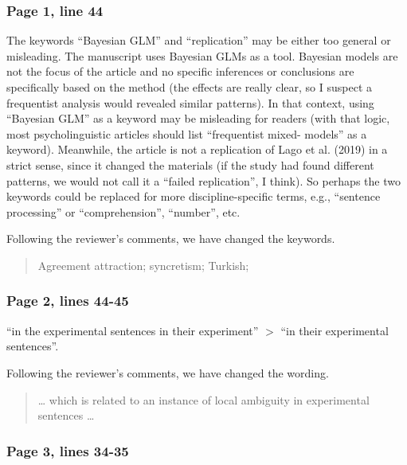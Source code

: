 \documentclass{ar2rc}
\begin{document}
\subsubsection{Page 1, line 44}

\RC The keywords ``Bayesian GLM'' and ``replication'' may be either too general or misleading. The manuscript uses Bayesian GLMs as a tool. Bayesian models are not the focus of the article and no specific inferences or conclusions are specifically based on the method (the effects are really clear, so I suspect a frequentist analysis would revealed similar patterns). In that context, using ``Bayesian GLM'' as a keyword may be misleading for readers (with that logic, most psycholinguistic articles should list ``frequentist mixed- models'' as a keyword). Meanwhile, the article is not a replication of Lago et al. (2019) in a strict sense, since it changed the materials (if the study had found different patterns, we would not call it a ``failed replication'', I think). So perhaps the two keywords could be replaced for more discipline-specific terms, e.g., ``sentence processing'' or ``comprehension'', ``number'', etc.

\AR Following the reviewer's comments, we have changed the keywords.

\begin{quote}
    Agreement attraction; syncretism; Turkish; \DIFaddbegin {}\DIFaddend \DIFdelbegin {} \DIFdellend
\end{quote}

\subsubsection{Page 2, lines 44-45}

\RC ``in the experimental sentences in their experiment'' $>$ ``in their experimental sentences''.

\AR Following the reviewer's comments, we have changed the wording.

\begin{quote}
    \ldots{} which is related to an instance of local ambiguity in \DIFaddbegin {} \DIFaddend \DIFdelbegin {} \DIFdelend experimental sentences \DIFdelbegin {} \DIFdelend{} \ldots
\end{quote}


\subsubsection{Page 3, lines 34-35}
\end{document}
